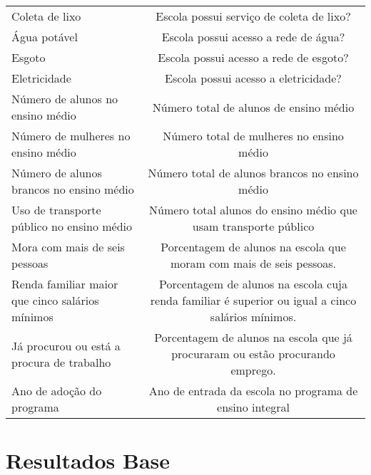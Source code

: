 \documentclass[
        12pt,                           %
        openright,                      %
        oneside,
        a4paper,                        %
        chapter=TITLE,         %
        section=TITLE,         %
        subsection=Title,      %
        english,                        %
        spanish,                        %
        portugues,                      %
        ]{abntex2}
\begin{document}
{\begin{apendicesenv}
\begin{landscape}
\begin{longtable}{cc}
\multicolumn{1}{l|}{Coleta de lixo}          & Escola possui serviço de coleta de lixo?                                    \\
\multicolumn{1}{l|}{Água potável}                      & Escola possui acesso a rede de água?                                        \\
\multicolumn{1}{l|}{Esgoto}                    & Escola possui acesso a rede de esgoto?                                      \\
\multicolumn{1}{l|}{Eletricidade}              & Escola possui acesso a eletricidade?                                        \\
\multicolumn{1}{l|}{Número de alunos no ensino médio}   & Número total de alunos de ensino médio                                      \\
\multicolumn{1}{l|}{Número de mulheres no ensino médio} & Número total de mulheres no ensino médio                             \\
\multicolumn{1}{l|}{Número de alunos brancos no ensino médio}  & Número total de alunos brancos no ensino médio                   \\
\multicolumn{1}{l|}{Uso de transporte público no ensino médio}  & Número total alunos do ensino médio que usam transporte público                   \\
\multicolumn{1}{l|}{Mora com mais de seis pessoas}      & Porcentagem de alunos na escola que moram com mais de seis pessoas.         \\
\multicolumn{1}{l|}{Renda familiar maior que cinco salários mínimos} &
  Porcentagem de alunos na escola cuja renda familiar é superior ou igual a cinco salários mínimos. \\
\multicolumn{1}{l|}{Já procurou ou está a procura de trabalho} &
  Porcentagem de alunos na escola que já procuraram ou estão procurando emprego. \\
\multicolumn{1}{l|}{Ano de adoção do programa}          & Ano de entrada da escola no programa de ensino integral  \\ 
\hline
\end{longtable}
\end{landscape}

\chapter{Resultados Base}\label{apendice_resultados}


\end{apendicesenv}}
\end{document}
